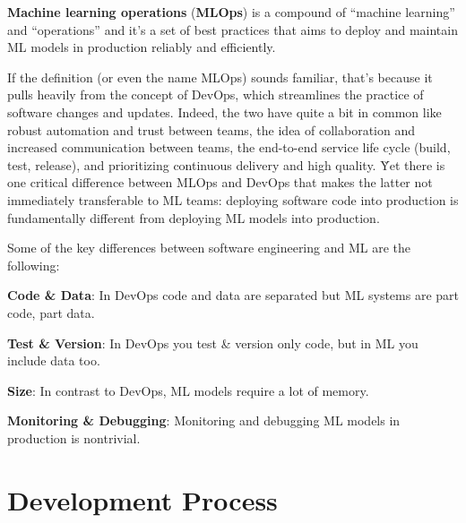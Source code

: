 \textbf{Machine learning operations} (\textbf{MLOps}) is a compound of ``machine learning'' and ``operations'' and
it's a set of best practices that aims to deploy and maintain ML models in production reliably and efficiently.
\ed

If the definition (or even the name MLOps) sounds familiar, that's because it pulls heavily from the concept of
DevOps, which streamlines the practice of software changes and updates. Indeed, the two have quite a bit in common
like robust automation and trust between teams, the idea of collaboration and increased communication between teams,
the end-to-end service life cycle (build, test, release), and prioritizing continuous delivery and high quality. \v

Yet there is one critical difference between MLOps and DevOps that makes the latter not immediately transferable to
ML teams: deploying software code into production is fundamentally different from deploying ML models into
production.


Some of the key differences between software engineering and ML are the following:
\bit
\item \textbf{Code \& Data}: In DevOps code and data are separated but ML systems are part code, part data.
\item \textbf{Test \& Version}: In DevOps you test \& version only code, but in ML you include data too.
\item \textbf{Size}: In contrast to DevOps, ML models require a lot of memory.
\item \textbf{Monitoring \& Debugging}: Monitoring and debugging ML models in production is nontrivial.
\eit

\section{Development Process}

